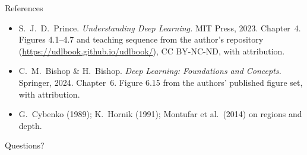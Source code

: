 \documentclass[aspectratio=169, 11pt]{beamer}
\newcommand{\nosrc}{}       %
\begin{document}
\begin{frame}{References}
  \nosrc
  \footnotesize
  \begin{itemize}
    \item S.~J.~D.~Prince. \textit{Understanding Deep
          Learning.} MIT Press, 2023. Chapter~4. Figures
          4.1--4.7 and teaching sequence from the author's
          repository (\url{https://udlbook.github.io/udlbook/}),
          CC BY-NC-ND, with attribution.
    \item C.~M.~Bishop \& H.~Bishop. \textit{Deep Learning:
          Foundations and Concepts.} Springer, 2024.
          Chapter~6. Figure 6.15 from the authors' published
          figure set, with attribution.
    \item G.~Cybenko (1989); K.~Hornik (1991);
          Montufar et al.\ (2014) on regions and depth.
  \end{itemize}
\end{frame}

\begin{frame}[standout]
  \nosrc
  Questions?
\end{frame}
\end{document}
